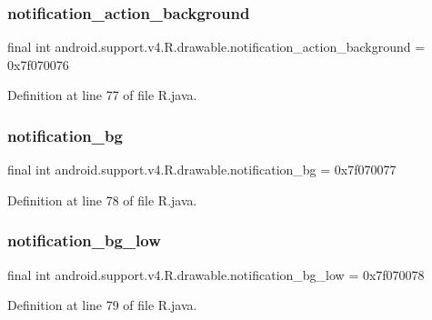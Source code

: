 \subsubsection{\texorpdfstring{notification\_action\_background}{notification\_action\_background}}
{\footnotesize\ttfamily final int android.\+support.\+v4.\+R.\+drawable.\+notification\+\_\+action\+\_\+background = 0x7f070076\hspace{0.3cm}{\ttfamily [static]}}



Definition at line 77 of file R.\+java.

\mbox{\label{classandroid_1_1support_1_1v4_1_1_r_1_1drawable_a0d0d6a26167a46b4f5473be51838a398}} 
\subsubsection{\texorpdfstring{notification\_bg}{notification\_bg}}
{\footnotesize\ttfamily final int android.\+support.\+v4.\+R.\+drawable.\+notification\+\_\+bg = 0x7f070077\hspace{0.3cm}{\ttfamily [static]}}



Definition at line 78 of file R.\+java.

\mbox{\label{classandroid_1_1support_1_1v4_1_1_r_1_1drawable_ab0f27bdda695d0483467980ff9046e64}} 
\subsubsection{\texorpdfstring{notification\_bg\_low}{notification\_bg\_low}}
{\footnotesize\ttfamily final int android.\+support.\+v4.\+R.\+drawable.\+notification\+\_\+bg\+\_\+low = 0x7f070078\hspace{0.3cm}{\ttfamily [static]}}



Definition at line 79 of file R.\+java.

